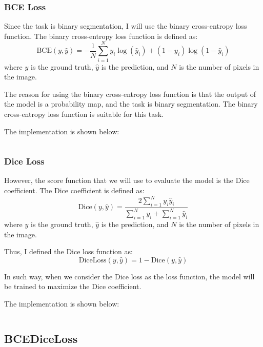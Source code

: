 \subsubsection{BCE Loss}

Since the task is binary segmentation, I will use the binary cross-entropy loss function.
The binary cross-entropy loss function is defined as:
\begin{equation}
    \text{BCE}(y, \hat{y}) = -\frac{1}{N} \sum_{i=1}^{N} y_i \log(\hat{y}_i) + (1 - y_i) \log(1 - \hat{y}_i)
\end{equation}
where $y$ is the ground truth, $\hat{y}$ is the prediction, and $N$ is the number of pixels in the image.

The reason for using the binary cross-entropy loss function is that the output of the model is a probability map, and the task is binary segmentation.
The binary cross-entropy loss function is suitable for this task.

The implementation is shown below:

\inputminted[firstline=23, lastline=28, highlightlines=25]{python}{../src/utils.py}

\subsubsection{Dice Loss}

However, the score function that we will use to evaluate the model is the Dice coefficient.
The Dice coefficient is defined as:
\begin{equation}
    \text{Dice}(y, \hat{y}) = \frac{2 \sum_{i=1}^{N} y_i \hat{y}_i}{\sum_{i=1}^{N} y_i + \sum_{i=1}^{N} \hat{y}_i}
\end{equation}
where $y$ is the ground truth, $\hat{y}$ is the prediction, and $N$ is the number of pixels in the image.

Thus, I defined the Dice loss function as:
\begin{equation}
    \text{DiceLoss}(y, \hat{y}) = 1 - \text{Dice}(y, \hat{y})
\end{equation}

In such way, when we consider the Dice loss as the loss function, the model will be trained to maximize the Dice coefficient.

The implementation is shown below:

\inputminted[firstline=31, lastline=41, highlightlines={39-41}]{python}{../src/utils.py}

\subsection{BCEDiceLoss}

